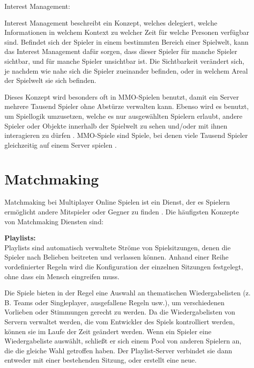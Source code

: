 \textsf{\Large Interest Management:}
\label{interest_management}

Interest Management beschreibt ein Konzept, welches delegiert, welche Informationen in welchem Kontext zu welcher Zeit für welche Personen verfügbar sind. Befindet sich der Spieler in einem bestimmten Bereich einer Spielwelt, kann das Interest Management dafür sorgen, dass dieser Spieler für manche Spieler sichtbar, und für manche Spieler unsichtbar ist. Die Sichtbarkeit verändert sich, je nachdem wie nahe sich die Spieler zueinander befinden, oder in welchem Areal der Spielwelt sie sich befinden.

Dieses Konzept wird besonders oft in MMO-Spielen benutzt, damit ein Server mehrere Tausend Spieler ohne Abstürze verwalten kann. Ebenso wird es benutzt, um Spiellogik umzusetzen, welche es nur ausgewählten Spielern erlaubt, andere Spieler oder Objekte innerhalb der Spielwelt zu sehen und/oder mit ihnen interagieren zu dürfen \cite{Smed.2002c}. MMO-Spiele sind Spiele, bei denen viele Tausend Spieler gleichzeitig auf einem Server spielen \cite{Wikipedia.2021i}. 

\newpage

\section{Matchmaking}

Matchmaking bei Multiplayer Online Spielen ist ein Dienst, der es Spielern ermöglicht andere Mitspieler oder Gegner zu finden \cite{MaximeVeron.2014}.  Die häufigsten Konzepte von Matchmaking Diensten sind:

\textbf{Playlists:} \\
Playlists sind automatisch verwaltete Ströme von Spielsitzungen, denen die Spieler nach Belieben beitreten und verlassen können. Anhand einer Reihe vordefinierter Regeln wird die Konfiguration der einzelnen Sitzungen festgelegt, ohne dass ein Mensch eingreifen muss.  

Die Spiele bieten in der Regel eine Auswahl an thematischen Wiedergabelisten (z. B. Teams oder Singleplayer, ausgefallene Regeln usw.), um verschiedenen Vorlieben oder Stimmungen gerecht zu werden. Da die Wiedergabelisten von Servern verwaltet werden, die vom Entwickler des Spiels kontrolliert werden, können sie im Laufe der Zeit geändert werden. Wenn ein Spieler eine Wiedergabeliste auswählt, schließt er sich einem Pool von anderen Spielern an, die die gleiche Wahl getroffen haben. Der Playlist-Server verbindet sie dann entweder mit einer bestehenden Sitzung, oder erstellt eine neue. \cite{Wikipedia.2021b}

